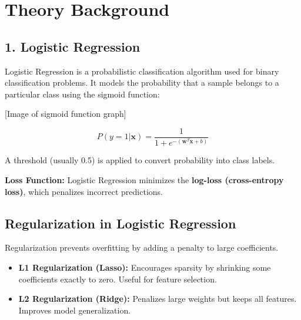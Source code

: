 \documentclass[11pt]{article}
\begin{document}
\section*{Theory Background}

\subsection*{1. Logistic Regression}
Logistic Regression is a probabilistic classification algorithm used for binary classification problems. 
It models the probability that a sample belongs to a particular class using the sigmoid function:



[Image of sigmoid function graph]


\[
P(y=1|\mathbf{x}) = \frac{1}{1 + e^{-(\mathbf{w}^T\mathbf{x} + b)}}
\]

A threshold (usually 0.5) is applied to convert probability into class labels.

\textbf{Loss Function:} 
Logistic Regression minimizes the \textbf{log-loss (cross-entropy loss)}, which penalizes incorrect predictions.

\subsection*{Regularization in Logistic Regression}
Regularization prevents overfitting by adding a penalty to large coefficients.

\begin{itemize}
    \item \textbf{L1 Regularization (Lasso):} 
    Encourages sparsity by shrinking some coefficients exactly to zero. 
    Useful for feature selection.
    
    \item \textbf{L2 Regularization (Ridge):} 
    Penalizes large weights but keeps all features. 
    Improves model generalization.
\end{itemize}
\end{document}

